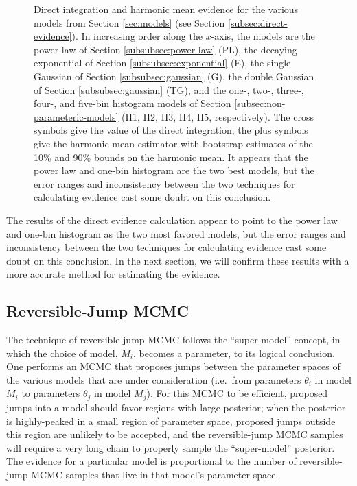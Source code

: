 \documentclass[preprint]{aastex}
\begin{document}
\begin{figure}
  \begin{center}
  \end{center}
  \caption{\label{fig:direct-evidence} Direct integration and harmonic
    mean evidence for the various models from Section \ref{sec:models}
    (see Section \ref{subsec:direct-evidence}).  In increasing
    order along the $x$-axis, the models are the power-law of
    Section \ref{subsubsec:power-law} (PL), the decaying
    exponential of Section \ref{subsubsec:exponential} (E), the
    single Gaussian of Section \ref{subsubsec:gaussian} (G), the
    double Gaussian of Section \ref{subsubsec:gaussian} (TG),
    and the one-, two-, three-, four-, and five-bin histogram models
    of Section \ref{subsec:non-parameteric-models} (H1, H2, H3, H4,
    H5, respectively).  The cross symbols give the value of the direct
    integration; the plus symbols give the harmonic mean estimator
    with bootstrap estimates of the 10\% and 90\% bounds on the
    harmonic mean.  It appears that the power law and one-bin
    histogram are the two best models, but the error ranges and
    inconsistency between the two techniques for calculating evidence
    cast some doubt on this conclusion.}
\end{figure}

The results of the direct evidence calculation appear to point to the
power law and one-bin histogram as the two most favored models, but
the error ranges and inconsistency between the two techniques for
calculating evidence cast some doubt on this conclusion.  In the next
section, we will confirm these results with a more accurate method for
estimating the evidence.

\subsection{Reversible-Jump MCMC}
\label{subsec:reversible-jump-mcmc}

The technique of reversible-jump MCMC \citep{Green1995} follows the
``super-model'' concept, in which the choice of model, $M_i$, becomes
a parameter, to its logical conclusion.  One performs an MCMC that
proposes jumps between the parameter spaces of the various models that
are under consideration (i.e.\ from parameters $\theta_i$ in model
$M_i$ to parameters $\theta_j$ in model $M_j$).  For this MCMC to be
efficient, proposed jumps into a model should favor regions with large
posterior; when the posterior is highly-peaked in a small region of
parameter space, proposed jumps outside this region are unlikely to be
accepted, and the reversible-jump MCMC samples will require a very
long chain to properly sample the ``super-model'' posterior.  The
evidence for a particular model is proportional to the number of
reversible-jump MCMC samples that live in that model's parameter
space.
\end{document}
